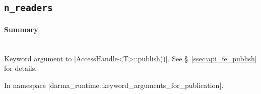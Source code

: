 \subsection{\texttt{n\_readers}}


\paragraph{Summary}\mbox{}\\ 

Keyword argument to |AccessHandle<T>::publish()|.  See
\S~\ref{ssec:api_fe_publish} for details.

In namespace |darma_runtime::keyword_arguments_for_publication|.

%
%
%
%
%
%




